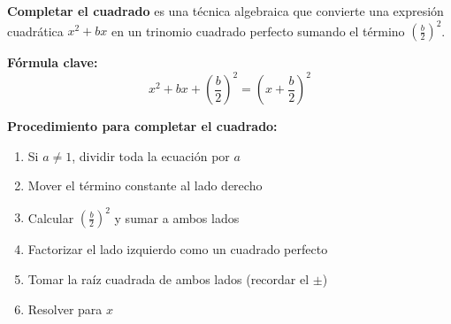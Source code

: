 \begin{definition}
\textbf{Completar el cuadrado} es una técnica algebraica que convierte una expresión cuadrática $x^2 + bx$ en un trinomio cuadrado perfecto sumando el término $\left(\frac{b}{2}\right)^2$.
\end{definition}

\textbf{Fórmula clave:}
$$x^2 + bx + \left(\frac{b}{2}\right)^2 = \left(x + \frac{b}{2}\right)^2$$

\begin{center}
\end{center}

\textbf{Procedimiento para completar el cuadrado:}

\begin{enumerate}
\item Si $a \neq 1$, dividir toda la ecuación por $a$
\item Mover el término constante al lado derecho
\item Calcular $\left(\frac{b}{2}\right)^2$ y sumar a ambos lados
\item Factorizar el lado izquierdo como un cuadrado perfecto
\item Tomar la raíz cuadrada de ambos lados (recordar el $\pm$)
\item Resolver para $x$
\end{enumerate}

